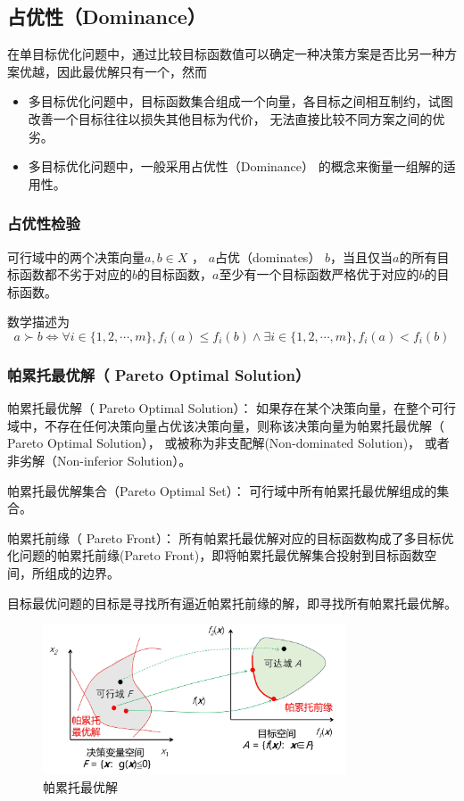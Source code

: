 \subsection{占优性（Dominance）}

在单目标优化问题中，通过比较目标函数值可以确定一种决策方案是否比另一种方案优越，因此最优解只有一个，然而

\begin{itemize}[itemsep=0pt,parsep=0pt]
    \item 多目标优化问题中，目标函数集合组成一个向量，各目标之间相互制约，试图改善一个目标往往以损失其他目标为代价， 无法直接比较不同方案之间的优劣。
    \item 多目标优化问题中，一般采用占优性（Dominance） 的概念来衡量一组解的适用性。
\end{itemize}

\subsubsection{占优性检验}

可行域中的两个决策向量$a, b \in X$ ， $a$占优（dominates） $b$，当且仅当$a$的所有目标函数都不劣于对应的$b$的目标函数，$a$至少有一个目标函数严格优于对应的$b$的目标函数。

数学描述为
\begin{equation}
    a \succ b \Leftrightarrow \forall i \in \{1,2,\cdots,m\}, f_i(a) \leq f_i(b) \land \exists i \in \{1,2,\cdots,m\}, f_i(a) < f_i(b)
\end{equation}

\subsubsection{帕累托最优解（ Pareto Optimal Solution）}

帕累托最优解（ Pareto Optimal Solution）： 如果存在某个决策向量，在整个可行域中，不存在任何决策向量占优该决策向量，则称该决策向量为帕累托最优解（ Pareto Optimal Solution）， 或被称为非支配解(Non-dominated Solution)， 或者非劣解（Non-inferior Solution）。

帕累托最优解集合（Pareto Optimal Set）： 可行域中所有帕累托最优解组成的集合。

帕累托前缘（ Pareto Front）： 所有帕累托最优解对应的目标函数构成了多目标优化问题的帕累托前缘(Pareto Front)，即将帕累托最优解集合投射到目标函数空间，所组成的边界。

目标最优问题的目标是寻找所有逼近帕累托前缘的解，即寻找所有帕累托最优解。

\begin{figure}[ht]
    \centering
    \includegraphics[width=0.8\textwidth]{pic/2.7.2.png}
    \caption{帕累托最优解}
\end{figure}

